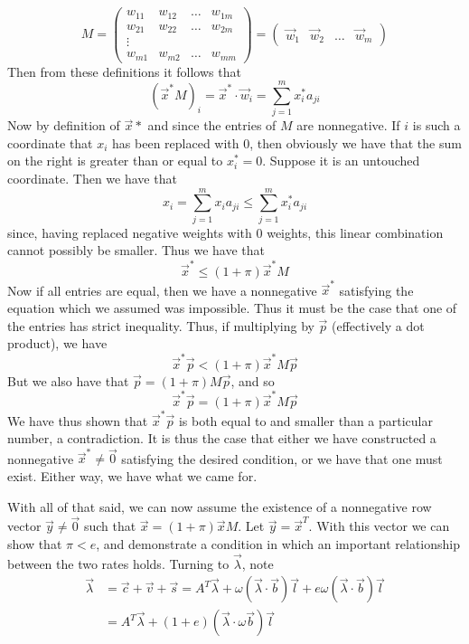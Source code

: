 \documentclass{article}
\theoremstyle{definition}
\theoremstyle{plain}
\theoremstyle{theorem}
\begin{document}
\[ M = \begin{pmatrix} w_{11} & w_{12} & \ldots & w_{1m} \\
		w_{21} & w_{22} & \ldots & w_{2m} \\
		\vdots \\ w_{m1} & w_{m2} & \ldots & w_{mm} \end{pmatrix} = \begin{pmatrix} \vec{w}_1 & \vec{w}_2 & \ldots & \vec{w}_m \end{pmatrix} \]
Then from these definitions it follows that 
\[ (\vec{x}^*M)_i = \vec{x}^* \cdot \vec{w}_i = \sum_{j=1}^m x^*_ia_{ji} \]
Now by definition of $\vec{x}*$ and since the entries of $M$ are nonnegative. If $i$ is such a coordinate that $x_i$ has been replaced with $0$, then obviously we have that the sum on the right is greater than or equal to $x^*_i = 0$. Suppose it is an untouched coordinate. Then we have that
\[ x_i = \sum_{j=1}^m x_ia_{ji} \leq \sum_{j=1}^m x_i^*a_{ji} \]
since, having replaced negative weights with $0$ weights, this linear combination cannot possibly be smaller. Thus we have that
\[ \vec{x}^* \leq (1+\pi)\vec{x}^*M \]
Now if all entries are equal, then we have a nonnegative $\vec{x}^*$ satisfying the equation which we assumed was impossible. Thus it must be the case that one of the entries has strict inequality. Thus, if multiplying by $\vec{p}$ (effectively a dot product), we have
\[ \vec{x}^*\vec{p} < (1+\pi)\vec{x}^*M \vec{p} \]
But we also have that $\vec{p} = (1+\pi)M\vec{p}$, and so 
\[ \vec{x}^*\vec{p} = (1+\pi)\vec{x}^*M\vec{p} \]
We have thus shown that $\vec{x}^*\vec{p}$ is both equal to and smaller than a particular number, a contradiction. It is thus the case that either we have constructed a nonnegative $\vec{x}^* \neq \vec{0}$ satisfying the desired condition, or we have that one must exist. Either way, we have what we came for. \par 
With all of that said, we can now assume the existence of a nonnegative row vector $\vec{y} \neq\vec{0}$ such that $\vec{x} = (1+\pi)\vec{x}M$. Let $\vec{y} = \vec{x}^T$. With this vector we can show that $\pi < e$, and demonstrate a condition in which an important relationship between the two rates holds. Turning to $\vec{\lambda}$, note
\begin{align*}
	\vec{\lambda} &= \vec{c} + \vec{v} + \vec{s} = A^T\vec{\lambda} + \omega(\vec{\lambda}\cdot\vec{b})\vec{l} + e\omega(\vec{\lambda}\cdot\vec{b})\vec{l} \\
	&= A^T\vec{\lambda} + (1+e)(\vec{\lambda}\cdot \omega \vec{b})\vec{l} \\
\end{align*} 
\end{document}
